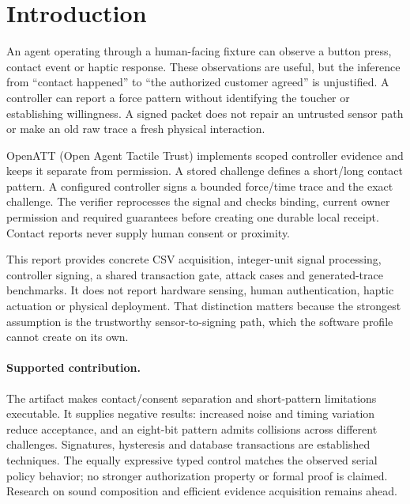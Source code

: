 \section{Introduction}
An agent operating through a human-facing fixture can observe a button press,
contact event or haptic response. These observations are useful, but the inference
from ``contact happened'' to ``the authorized customer agreed'' is unjustified.
A controller can report a force pattern without identifying the toucher or
establishing willingness. A signed packet does not repair an untrusted sensor
path or make an old raw trace a fresh physical interaction.

OpenATT (Open Agent Tactile Trust) implements scoped controller evidence and
keeps it separate from permission. A stored challenge defines a short/long
contact pattern. A configured controller signs a bounded force/time trace and
the exact challenge. The verifier reprocesses the signal and checks binding,
current owner permission and required guarantees before creating one durable
local receipt. Contact reports never supply human consent or proximity.

This report provides concrete CSV acquisition, integer-unit signal processing,
controller signing, a shared transaction gate, attack cases and generated-trace
benchmarks. It does not report hardware sensing, human authentication, haptic
actuation or physical deployment. That distinction matters because the strongest
assumption is the trustworthy sensor-to-signing path, which the software profile
cannot create on its own.

\paragraph{Supported contribution.}
The artifact makes contact/consent separation and short-pattern limitations
executable. It supplies negative results: increased noise and timing variation
reduce acceptance, and an eight-bit pattern admits collisions across different
challenges. Signatures, hysteresis and database transactions are established
techniques. The equally expressive typed control matches the observed serial
policy behavior; no stronger authorization property or formal proof is claimed.
Research on sound composition and efficient evidence acquisition remains ahead.

